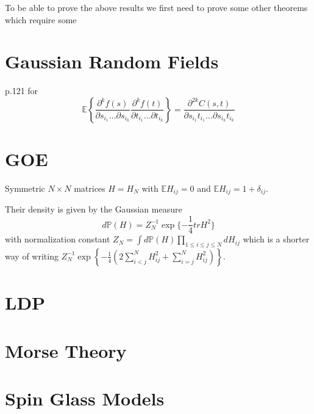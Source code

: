 To be able to prove the above results we first need to prove some other theorems which require some 

\section{Gaussian Random Fields}
\cite{Adler07} p.121 for \begin{equation}
	\mathbb E\left\{\frac{\partial^k f(s)}{\partial s_{i_1}\dots\partial s_{i_k}} \frac{\partial^k f(t)}{\partial t_{i_1}\dots\partial t_{i_k}}\right\}=\frac{\partial^{2k} C(s,t)}{\partial s_{i_1}t_{i_1}\dots\partial s_{i_k}t_{i_k}}
\end{equation}

\section{GOE}
\begin{definition}
	Symmetric $N\times N$ matrices $H=H_N$ with $\mathbb E H_{ij}=0$ and $\mathbb E H_{ij}=1+\delta_{ij}$.
\end{definition}
\begin{remark}
	Their density is given by the Gaussian measure
	\begin{equation}
		d\mathbb P(H)=Z_N^{-1}\exp\{-\frac{1}{4}tr H^2\}
	\end{equation}
	with normalization constant $Z_N=\int d\mathbb P(H)\prod_{1\leq i\leq j\leq N} dH_{ij}$ which is a shorter way of writing $Z_N^{-1}\exp\left\{-\frac{1}{4}\left(2\sum_{i<j}^N H_{ij}^2+\sum_{i=j}^N H_{ij}^2\right)\right\}$.
\end{remark}

\section{LDP}

\section{Morse Theory}

\section{Spin Glass Models}

